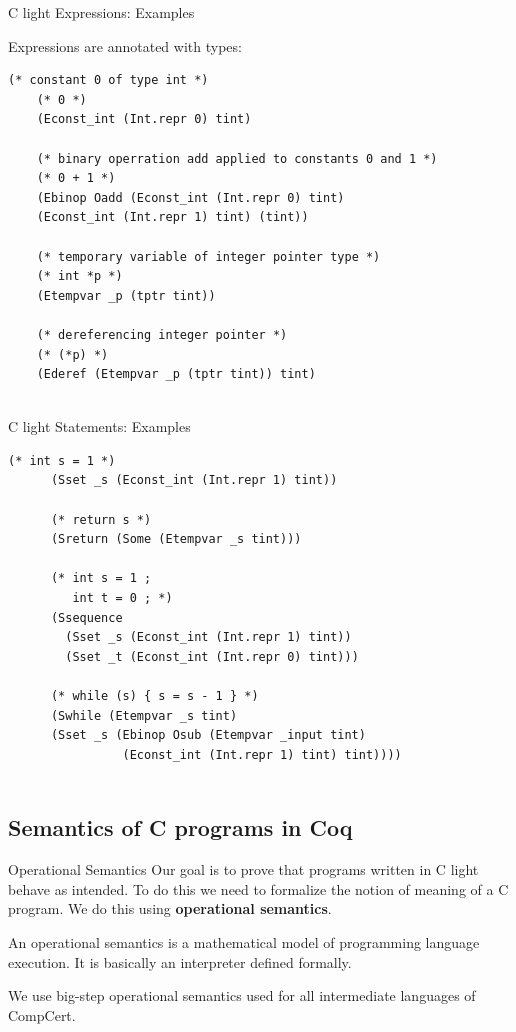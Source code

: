 \documentclass[10pt]{beamer}
\begin{document}
\begin{frame}[fragile]{C light Expressions: Examples}
  
  Expressions are annotated with types: 
  
  \begin{lstlisting}[language=Coq]
    (* constant 0 of type int *)
    (* 0 *)
    (Econst_int (Int.repr 0) tint) 
     
    (* binary operration add applied to constants 0 and 1 *)
    (* 0 + 1 *)
    (Ebinop Oadd (Econst_int (Int.repr 0) tint)
    (Econst_int (Int.repr 1) tint) (tint))
    
    (* temporary variable of integer pointer type *)
    (* int *p *)
    (Etempvar _p (tptr tint)) 
    
    (* dereferencing integer pointer *)
    (* (*p) *)
    (Ederef (Etempvar _p (tptr tint)) tint)


  \end{lstlisting}
  
\end{frame}

\begin{frame}[fragile]{C light Statements: Examples}

  \begin{lstlisting}[language=Coq]
     (* int s = 1 *)
      (Sset _s (Econst_int (Int.repr 1) tint))

      (* return s *)
      (Sreturn (Some (Etempvar _s tint)))
      
      (* int s = 1 ;
         int t = 0 ; *)
      (Ssequence 
        (Sset _s (Econst_int (Int.repr 1) tint))
        (Sset _t (Econst_int (Int.repr 0) tint)))
       
      (* while (s) { s = s - 1 } *)
      (Swhile (Etempvar _s tint) 
      (Sset _s (Ebinop Osub (Etempvar _input tint)
                (Econst_int (Int.repr 1) tint) tint))))


  \end{lstlisting}
  


\end{frame}

\subsection{Semantics of C programs in Coq}

\begin{frame}{Operational Semantics}
    Our goal is to prove that programs written in C light behave as intended. To do this we need to formalize the notion of meaning of a C program. We do this using {\bf operational semantics}.

    \bigskip
    
    An operational semantics is a mathematical model of programming language execution. It is basically an interpreter defined formally.
    \bigskip
    
    We use big-step operational semantics used for all intermediate languages of CompCert.
  \end{frame}
  
\end{document}
